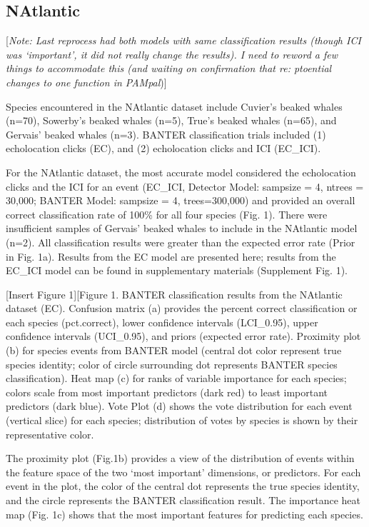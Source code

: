 \documentclass[
  letterpaper,
  DIV=11,
  numbers=noendperiod]{scrartcl}
\begin{document}
\hypertarget{natlantic}{%
\subsection{NAtlantic}\label{natlantic}}

{[}\emph{Note: Last reprocess had both models with same classification
results (though ICI was `important', it did not really change the
results). I need to reword a few things to accommodate this (and waiting
on confirmation that re: ptoential changes to one function in
PAMpal}){]}

Species encountered in the NAtlantic dataset include Cuvier's beaked
whales (n=70), Sowerby's beaked whales (n=5), True's beaked whales
(n=65), and Gervais' beaked whales (n=3). BANTER classification trials
included (1) echolocation clicks (EC), and (2) echolocation clicks and
ICI (EC\_ICI).

For the NAtlantic dataset, the most accurate model considered the
echolocation clicks and the ICI for an event (EC\_ICI, Detector Model:
sampsize = 4, ntrees = 30,000; BANTER Model: sampsize = 4,
trees=300,000) and provided an overall correct classification rate of
100\% for all four species (Fig. 1). There were insufficient samples of
Gervais' beaked whales to include in the NAtlantic model (n=2). All
classification results were greater than the expected error rate (Prior
in Fig. 1a). Results from the EC model are presented here; results from
the EC\_ICI model can be found in supplementary materials (Supplement
Fig. 1).

{[}Insert Figure 1{]}{[}Figure 1. BANTER classification results from the
NAtlantic dataset (EC). Confusion matrix (a) provides the percent
correct classification or each species (pct.correct), lower confidence
intervals (LCI\_0.95), upper confidence intervals (UCI\_0.95), and
priors (expected error rate). Proximity plot (b) for species events from
BANTER model (central dot color represent true species identity; color
of circle surrounding dot represents BANTER species classification).
Heat map (c) for ranks of variable importance for each species; colors
scale from most important predictors (dark red) to least important
predictors (dark blue). Vote Plot (d) shows the vote distribution for
each event (vertical slice) for each species; distribution of votes by
species is shown by their representative color.

The proximity plot (Fig.1b) provides a view of the distribution of
events within the feature space of the two `most important' dimensions,
or predictors. For each event in the plot, the color of the central dot
represents the true species identity, and the circle represents the
BANTER classification result. The importance heat map (Fig. 1c) shows
that the most important features for predicting each species.
\end{document}
